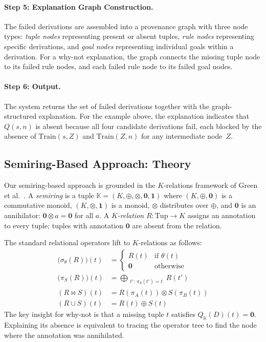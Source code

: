 \documentclass{llncs}
\begin{document}
\paragraph{Step 5: Explanation Graph Construction.}
The failed derivations are assembled into a provenance graph with three
node types: \emph{tuple nodes} representing present or absent tuples,
\emph{rule nodes} representing specific derivations, and \emph{goal
nodes} representing individual goals within a derivation. For a why-not
explanation, the graph connects the missing tuple node to its failed
rule nodes, and each failed rule node to its failed goal nodes.

\paragraph{Step 6: Output.}
The system returns the set of failed derivations together with the
graph-structured explanation. For the example above, the explanation
indicates that $Q(s,n)$ is absent because all four candidate
derivations fail, each blocked by the absence of $\mathrm{Train}(s,Z)$
and $\mathrm{Train}(Z,n)$ for any intermediate node~$Z$.

\subsection{Semiring-Based Approach: Theory}
\label{sec:semiring-theory}

Our semiring-based approach is grounded in the $K$-relations framework
of Green et al.~\cite{Green2007}. A \emph{semiring} is a tuple
$\mathbb{K} = (K, \oplus, \otimes, \mathbf{0}, \mathbf{1})$ where
$(K, \oplus, \mathbf{0})$ is a commutative monoid,
$(K, \otimes, \mathbf{1})$ is a monoid,
$\otimes$ distributes over $\oplus$, and
$\mathbf{0}$ is an annihilator: $\mathbf{0} \otimes a = \mathbf{0}$ for all $a$.
A \emph{$K$-relation} $R : \mathrm{Tup} \rightarrow K$ assigns an
annotation to every tuple; tuples with annotation $\mathbf{0}$ are
absent from the relation.

The standard relational operators lift to $K$-relations as follows:
\begin{align}
  \bigl(\sigma_\theta(R)\bigr)(t)
    &= \begin{cases} R(t) & \text{if } \theta(t) \\ \mathbf{0} & \text{otherwise} \end{cases}
    \label{eq:select}\\[2pt]
  \bigl(\pi_S(R)\bigr)(t)
    &= \bigoplus_{\substack{t':\,\pi_S(t')=t}} R(t')
    \label{eq:project}\\[2pt]
  (R \bowtie S)(t)
    &= R\!\left(\pi_A(t)\right) \otimes S\!\left(\pi_B(t)\right)
    \label{eq:join}\\[2pt]
  (R \cup S)(t)
    &= R(t) \oplus S(t)
    \label{eq:union}
\end{align}
The key insight for why-not is that a missing tuple $t$ satisfies
$Q_{\mathbb{K}}(D)(t) = \mathbf{0}$. Explaining its absence is
equivalent to tracing the operator tree to find the node where the
annotation was annihilated.
\end{document}
